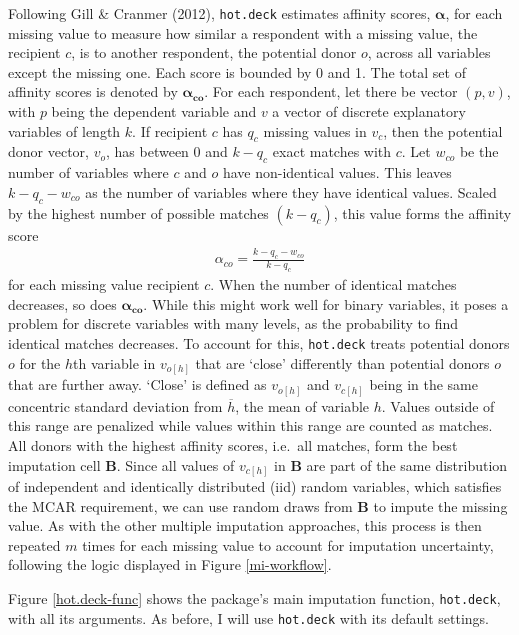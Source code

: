 \documentclass[12pt,econ]{sources/authesis}
\begin{document}
Following Gill \& Cranmer (2012), \texttt{hot.deck} estimates affinity scores, \(\bm{\alpha}\), for each missing value to measure how similar a respondent with a missing value, the recipient \(c\), is to another respondent, the potential donor \(o\), across all variables except the missing one. Each score is bounded by 0 and 1. The total set of affinity scores is denoted by \(\bm{\alpha_{co}}\). For each respondent, let there be vector \((p, v)\), with \(p\) being the dependent variable and \(v\) a vector of discrete explanatory variables of length \(k\). If recipient \(c\) has \(q_c\) missing values in \(v_c\), then the potential donor vector, \(v_o\), has between 0 and \(k-q_c\) exact matches with \(c\). Let \(w_{co}\) be the number of variables where \(c\) and \(o\) have non-identical values. This leaves \(k-q_c -w_{co}\) as the number of variables where they have identical values. Scaled by the highest number of possible matches \((k-q_c)\), this value forms the affinity score
\begin{align}
\alpha_{co} = \frac{k-q_c-w_{co}}{k-q_c}
\end{align}
for each missing value recipient \(c\). When the number of identical matches decreases, so does \(\bm{\alpha_{co}}\). While this might work well for binary variables, it poses a problem for discrete variables with many levels, as the probability to find identical matches decreases. To account for this, \texttt{hot.deck} treats potential donors \(o\) for the \(h\)th variable in \(v_{o[h]}\) that are `close' differently than potential donors \(o\) that are further away. `Close' is defined as \(v_{o[h]}\) and \(v_{c[h]}\) being in the same concentric standard deviation from \(\overline{h}\), the mean of variable \(h\). Values outside of this range are penalized while values within this range are counted as matches. All donors with the highest affinity scores, i.e.~all matches, form the best imputation cell \(\bm{B}\). Since all values of \(v_{c[h]}\) in \(\bm{B}\) are part of the same distribution of independent and identically distributed (iid) random variables, which satisfies the MCAR requirement, we can use random draws from \(\bm{B}\) to impute the missing value. As with the other multiple imputation approaches, this process is then repeated \(m\) times for each missing value to account for imputation uncertainty, following the logic displayed in Figure \ref{mi-workflow}.

Figure \ref{hot.deck-func} shows the package's main imputation function, \texttt{hot.deck}, with all its arguments. As before, I will use \texttt{hot.deck} with its default settings.
\end{document}
